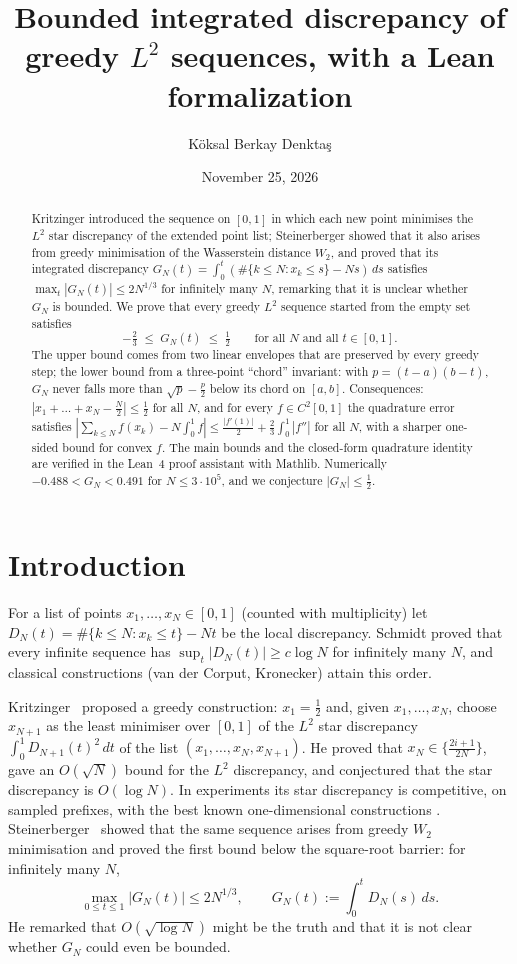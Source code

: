 \documentclass[11pt]{amsart}
\title[K.~B.~Denkta\c{s} \,---\, Bounded integrated discrepancy of greedy $L^2$ sequences]{Bounded integrated discrepancy of greedy $L^2$ sequences, with a Lean formalization}
\author{K\"oksal Berkay Denkta\c{s}}
\date{November 25, 2026}
\theoremstyle{remark}
\begin{document}
\begin{abstract}
Kritzinger introduced the sequence on $[0,1]$ in which each new point minimises
the $L^2$ star discrepancy of the extended point list; Steinerberger showed that
it also arises from greedy minimisation of the Wasserstein distance $W_2$, and
proved that its integrated discrepancy
$G_N(t)=\int_0^t(\#\{k\le N:x_k\le s\}-Ns)\,ds$ satisfies
$\max_t|G_N(t)|\le 2N^{1/3}$ for infinitely many $N$, remarking that it is
unclear whether $G_N$ is bounded. We prove that every greedy $L^2$ sequence started from the empty set
satisfies
\[
-\tfrac23\;\le\; G_N(t)\;\le\;\tfrac12\qquad\text{for all }N\text{ and all }t\in[0,1].
\]
The upper bound comes from two linear envelopes that are preserved by every
greedy step; the lower bound from a three-point ``chord'' invariant:
with $p=(t-a)(b-t)$, $G_N$ never falls more than $\sqrt p-\frac p2$ below its
chord on $[a,b]$.
Consequences: $|x_1+\dots+x_N-\frac N2|\le\frac12$ for all $N$, and for every
$f\in C^2[0,1]$ the quadrature error satisfies
$|\sum_{k\le N}f(x_k)-N\int_0^1f|\le\frac{|f'(1)|}{2}+\frac23\int_0^1|f''|$
for all $N$, with a sharper one-sided bound for convex $f$. The main bounds and
the closed-form quadrature identity are verified in the Lean~4 proof assistant
with Mathlib. Numerically
$-0.488<G_N<0.491$ for $N\le3\cdot10^5$, and we conjecture $|G_N|\le\frac12$.
\end{abstract}

\maketitle

\section{Introduction}

For a list of points $x_1,\dots,x_N\in[0,1]$ (counted with multiplicity) let
$D_N(t)=\#\{k\le N: x_k\le t\}-Nt$ be the local discrepancy. Schmidt proved
that every infinite sequence has $\sup_t|D_N(t)|\ge c\log N$ for infinitely
many $N$, and classical constructions (van der Corput, Kronecker) attain this
order.

Kritzinger~\cite{Kri} proposed a greedy construction: $x_1=\tfrac12$ and, given
$x_1,\dots,x_N$, choose $x_{N+1}$ as the least minimiser over $[0,1]$ of the
$L^2$ star discrepancy $\int_0^1 D_{N+1}(t)^2\,dt$ of the list
$(x_1,\dots,x_N,x_{N+1})$. He proved that $x_N\in\{\frac{2i+1}{2N}\}$, gave an
$O(\sqrt N)$ bound for the $L^2$ discrepancy, and conjectured that the star
discrepancy is $O(\log N)$. In experiments its star discrepancy is
competitive, on sampled prefixes, with the best known one-dimensional
constructions \cite{Kri,Ste,Cle}.
Steinerberger~\cite{Ste} showed that the same sequence arises from greedy $W_2$
minimisation and proved the first bound below the square-root barrier: for
infinitely many $N$,
\[
\max_{0\le t\le 1}|G_N(t)|\le 2N^{1/3},\qquad
G_N(t):=\int_0^t D_N(s)\,ds .
\]
He remarked that $O(\sqrt{\log N})$ might be the truth and that it is not clear
whether $G_N$ could even be bounded.
\end{document}
